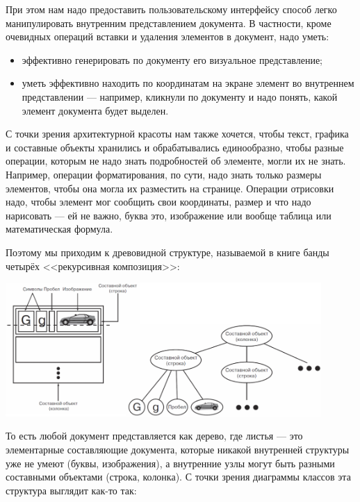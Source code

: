 \documentclass{../mcstext}
\begin{document}
При этом нам надо предоставить пользовательскому интерфейсу способ легко манипулировать внутренним представлением документа. В частности, кроме очевидных операций вставки и удаления элементов в документ, надо уметь:

\begin{itemize}
    \item эффективно генерировать по документу его визуальное представление;
    \item уметь эффективно находить по координатам на экране элемент во внутреннем представлении --- например, кликнули по документу и надо понять, какой элемент документа будет выделен.
\end{itemize}

С точки зрения архитектурной красоты нам также хочется, чтобы текст, графика и составные объекты хранились и обрабатывались единообразно, чтобы разные операции, которым не надо знать подробностей об элементе, могли их не знать. Например, операции форматирования, по сути, надо знать только размеры элементов, чтобы она могла их разместить на странице. Операции отрисовки надо, чтобы элемент мог сообщить свои координаты, размер и что надо нарисовать --- ей не важно, буква это, изображение или вообще таблица или математическая формула.

Поэтому мы приходим к древовидной структуре, называемой в книге банды четырёх <<рекурсивная композиция>>:

\begin{center}
    \includegraphics[width=0.9\textwidth]{recursiveComposition.png}
\end{center}

То есть любой документ представляется как дерево, где листья --- это элементарные составляющие документа, которые никакой внутренней структуры уже не умеют (буквы, изображения), а внутренние узлы могут быть разными составными объектами (строка, колонка). С точки зрения диаграммы классов эта структура выглядит как-то так:
\end{document}
